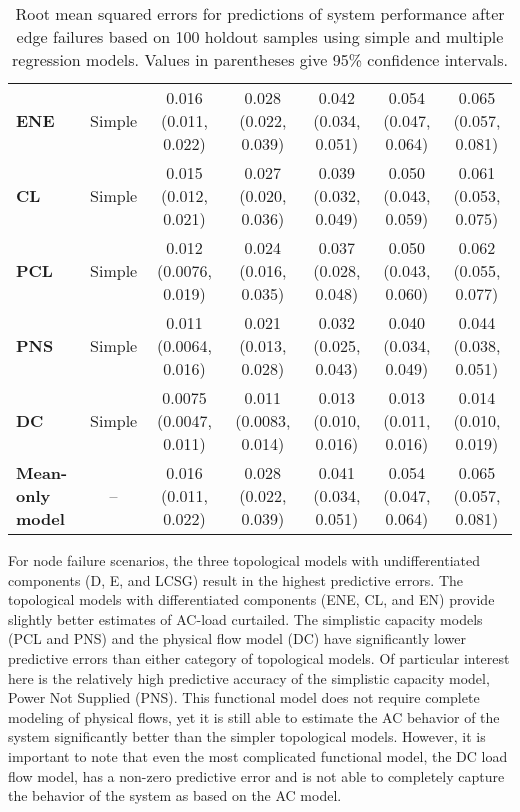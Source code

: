 \begin{landscape}
\begin{table}[!hp]
\begin{tabular}{lcccccc}
\textbf{ENE} & Simple & 0.016 (0.011, 0.022) & 0.028 (0.022, 0.039) & 0.042 (0.034, 0.051) & 0.054 (0.047, 0.064) & 0.065 (0.057, 0.081) \\ 
\textbf{CL} & Simple & 0.015 (0.012, 0.021) & 0.027 (0.020, 0.036) & 0.039 (0.032, 0.049) & 0.050 (0.043, 0.059) & 0.061 (0.053, 0.075) \\ 
\textbf{PCL} & Simple & 0.012 (0.0076, 0.019) & 0.024 (0.016, 0.035) & 0.037 (0.028, 0.048) & 0.050 (0.043, 0.060) & 0.062 (0.055, 0.077) \\ 
\textbf{PNS} & Simple & 0.011 (0.0064, 0.016) & 0.021 (0.013, 0.028) & 0.032 (0.025, 0.043) & 0.040 (0.034, 0.049) & 0.044 (0.038, 0.051) \\ 
\textbf{DC} & Simple & 0.0075 (0.0047, 0.011) & 0.011 (0.0083, 0.014) & 0.013 (0.010, 0.016) & 0.013 (0.011, 0.016) & 0.014 (0.010, 0.019) \\ 
\textbf{Mean-only model} & -- & 0.016 (0.011, 0.022) & 0.028 (0.022, 0.039) & 0.041 (0.034, 0.051) & 0.054 (0.047, 0.064) & 0.065 (0.057, 0.081) \\ 

\bottomrule

\end{tabular}

\caption[Root mean squared errors for predictions of system performance after edge failures.]{\label{tab:ch3:errorEdges}Root mean squared errors for predictions of system performance after edge failures based on 100 holdout samples using simple and multiple regression models. Values in parentheses give 95\% confidence intervals.}

\end{table}
\vspace*{\fill}
\end{landscape}

For node failure scenarios, the three topological models with undifferentiated components (D, E, and LCSG) result in the highest predictive errors.  The topological models with differentiated components (ENE, CL, and EN) provide slightly better estimates of AC-load curtailed.  The simplistic capacity models (PCL and PNS) and the physical flow model (DC) have significantly lower predictive errors than either category of topological models.  Of particular interest here is the relatively high predictive accuracy of the simplistic capacity model, Power Not Supplied (PNS).  This functional model does not require complete modeling of physical flows, yet it is still able to estimate the AC behavior of the system significantly better than the simpler topological models.  However, it is important to note that even the most complicated functional model, the DC load flow model, has a non-zero predictive error and is not able to completely capture the behavior of the system as based on the AC model.

